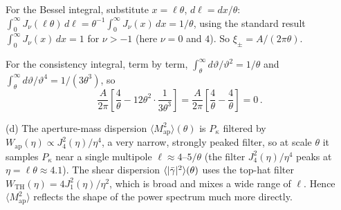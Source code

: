 \begin{derivation}
For the Bessel integral, substitute $x = \ell\theta$, $d\ell = dx/\theta$:
$\int_0^\infty J_\nu(\ell\theta)\,d\ell = \theta^{-1}\int_0^\infty
J_\nu(x)\,dx = 1/\theta$, using the standard result $\int_0^\infty J_\nu(x)\,dx
= 1$ for $\nu > -1$ (here $\nu = 0$ and $4$).  So $\xi_\pm = A/(2\pi\theta)$.

For the consistency integral, term by term,
$\int_\theta^\infty d\vartheta/\vartheta^2 = 1/\theta$ and
$\int_\theta^\infty d\vartheta/\vartheta^4 = 1/(3\theta^3)$, so
\begin{equation*}
    \frac{A}{2\pi}\left[\frac{4}{\theta} - 12\theta^2\cdot\frac{1}{3\theta^3}
    \right] = \frac{A}{2\pi}\left[\frac4\theta - \frac4\theta\right] = 0\,.
\end{equation*}
\end{derivation}

(d) The aperture-mass dispersion
$\langle M_{\mathrm{ap}}^2\rangle(\theta)$ is $P_\kappa$ filtered by
$W_{\mathrm{ap}}(\eta) \propto J_4^2(\eta)/\eta^4$, a very narrow,
strongly peaked filter, so at scale $\theta$ it samples $P_\kappa$ near a
single multipole $\ell \approx 4$--$5/\theta$ (the filter
$J_4^2(\eta)/\eta^4$ peaks at $\eta = \ell\theta \approx 4.1$).  The shear dispersion
$\langle|\bar{\gamma}|^2\rangle(\theta)$ uses the top-hat filter
$W_{\mathrm{TH}}(\eta) = 4J_1^2(\eta)/\eta^2$, which is broad and mixes a
wide range of $\ell$.  Hence $\langle M_{\mathrm{ap}}^2\rangle$ reflects
the shape of the power spectrum much more directly. \checkmark
